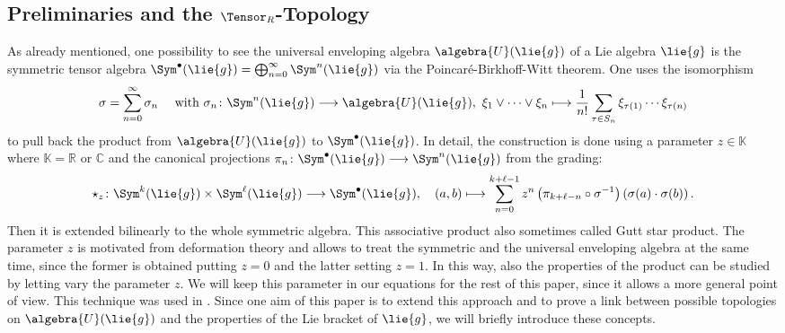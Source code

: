 \documentclass[
11pt,                          %
english                        %
]{article}
\begin{document}
\subsection{Preliminaries and the $\Tensor_R$-Topology}
As already mentioned, one possibility to see the universal enveloping algebra 
$\algebra{U}(\lie{g})$ of a Lie algebra $\lie{g}$ is the symmetric tensor algebra 
$\Sym^{\bullet}(\lie{g}) = \bigoplus_{n=0}^\infty \Sym^n(\lie{g})$ via the 
Poincar\'e-Birkhoff-Witt theorem. One uses the isomorphism
\begin{equation}
	\label{eq:pbw-isomorphism}
	\sigma
	=
	\sum\limits_{n=0}^\infty
	\sigma_n
	\quad \text{ with }
	\sigma_n
	\colon
	\Sym^n(\lie{g})
	\longrightarrow
	\algebra{U}(\lie{g})
	, \
	\xi_1 \vee \cdots \vee \xi_n
	\longmapsto
	\frac{1}{n!}
	\sum\limits_{\tau \in S_n}
	\xi_{\tau(1)} \cdots \xi_{\tau(n)}
\end{equation}
to pull back the product from $\algebra{U}(\lie{g})$ to $\Sym^{\bullet}(\lie{g})$. 
In detail, the construction is done using a parameter $z \in \mathbb{K}$ where 
$\mathbb{K} = \mathbb{R}$ or $\mathbb{C}$ and the canonical projections $\pi_n 
\colon \Sym^{\bullet}(\lie{g}) \longrightarrow \Sym^n(\lie{g})$ from the grading:
\begin{equation}
	\label{eq:starproduct}
	\star_z
	\colon
	\Sym^k(\lie{g})
	\times
	\Sym^\ell(\lie{g})
	\longrightarrow
	\Sym^{\bullet}(\lie{g})
	, \quad
	(a, b)
	\longmapsto
	\sum\limits_{n=0}^{k + \ell - 1}
	z^n
	\left( \pi_{k + \ell - n} \circ \sigma^{-1} \right)
	\left(
		\sigma(a)
		\cdot
		\sigma(b)
	\right).
\end{equation}
Then it is extended bilinearly to the whole symmetric algebra. This associative 
product also sometimes called Gutt star product.
The parameter $z$ is motivated from deformation theory and allows to treat the 
symmetric and the universal enveloping algebra at the same time, since the former is 
obtained putting $z = 0$ and the latter setting $z = 1$. In this way, also the 
properties of the product can be studied by letting vary the parameter $z$. We will 
keep this parameter in our equations for the rest of this paper, since it allows a 
more general point of view. This technique was used in 
\cite{esposito.stapor.waldmann:2015a:pre}. Since one aim of this paper is to extend 
this approach and to prove a link between possible topologies on $\algebra{U}
(\lie{g})$ and the properties of the Lie bracket of $\lie{g}$, we will briefly
introduce these concepts.
\end{document}
